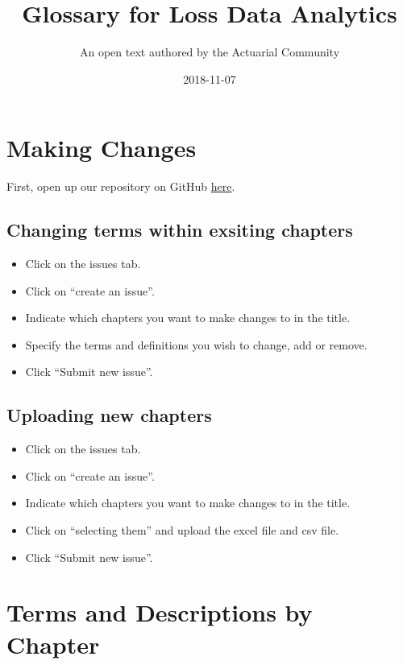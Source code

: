 \documentclass[]{book}
\title{Glossary for Loss Data Analytics}
\author{An open text authored by the Actuarial Community}
\date{2018-11-07}
\providecommand{\tightlist}{%
  \setlength{\itemsep}{0pt}\setlength{\parskip}{0pt}}
\theoremstyle{definition}
\theoremstyle{definition}
\theoremstyle{definition}
\theoremstyle{remark}
\begin{document}
\maketitle

{
\setcounter{tocdepth}{1}
\tableofcontents
}
\chapter{Making Changes}\label{making-changes}

First, open up our repository on GitHub
\href{https://github.com/alyaanuval/LDAGlossary/issues}{here}.

\section{Changing terms within exsiting
chapters}\label{changing-terms-within-exsiting-chapters}

\begin{itemize}
\tightlist
\item
  Click on the issues tab.
\item
  Click on ``create an issue''.
\item
  Indicate which chapters you want to make changes to in the title.
\item
  Specify the terms and definitions you wish to change, add or remove.
\item
  Click ``Submit new issue''.
\end{itemize}

\section{Uploading new chapters}\label{uploading-new-chapters}

\begin{itemize}
\tightlist
\item
  Click on the issues tab.
\item
  Click on ``create an issue''.
\item
  Indicate which chapters you want to make changes to in the title.
\item
  Click on ``selecting them'' and upload the excel file and csv file.
\item
  Click ``Submit new issue''.
\end{itemize}

\chapter{Terms and Descriptions by
Chapter}\label{terms-and-descriptions-by-chapter}
\end{document}
